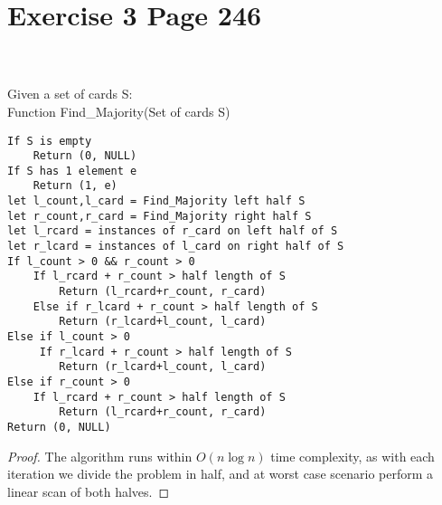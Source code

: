 \documentclass[11pt]{article}
\begin{document}
\section*{Exercise 3 Page 246}
 \\ \\
Given a set of cards S: \\
Function Find\_Majority(Set of cards S)
\begin{lstlisting}
If S is empty
	Return (0, NULL)
If S has 1 element e
	Return (1, e)
let l_count,l_card = Find_Majority left half S
let r_count,r_card = Find_Majority right half S
let l_rcard = instances of r_card on left half of S
let r_lcard = instances of l_card on right half of S
If l_count > 0 && r_count > 0
	If l_rcard + r_count > half length of S
		Return (l_rcard+r_count, r_card)
	Else if r_lcard + r_count > half length of S
		Return (r_lcard+l_count, l_card)
Else if l_count > 0
	 If r_lcard + r_count > half length of S
		Return (r_lcard+l_count, l_card)
Else if r_count > 0
	If l_rcard + r_count > half length of S
		Return (l_rcard+r_count, r_card)
Return (0, NULL)
\end{lstlisting}
\begin{proof}
The algorithm runs within $O(n\log n)$ time complexity, as with each iteration we divide the problem in half, and at worst case scenario perform a linear scan of both halves.
\end{proof}
\newpage
\end{document}
